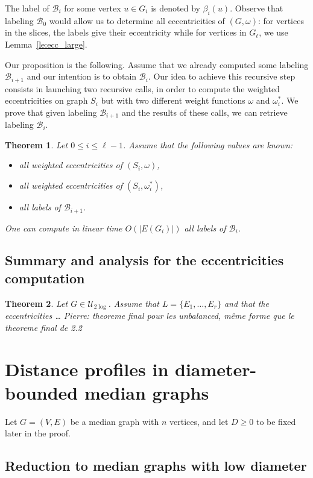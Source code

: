 \documentclass[11pt,letterpaper]{article}
\newtheorem{theorem}{Theorem}
\newcommand{\ulog}{\mathcal{U}_{2\log}}
\newcommand{\PB}[1]{{\color{orange} Pierre: #1}}
\begin{document}
The label of $\mathcal{B}_i$ for some vertex $u \in G_i$ is denoted by $\beta_i(u)$. Observe that labeling $\mathcal{B}_0$ would allow us to determine all eccentricities of $(G,\omega)$: for vertices in the slices, the labels give their eccentricity while for vertices in $G_{\ell}$, we use Lemma~\ref{le:ecc_large}. 

Our proposition is the following. Assume that we already computed some labeling $\mathcal{B}_{i+1}$ and our intention is to obtain $\mathcal{B}_i$. Our idea to achieve this recursive step consists in launching two recursive calls, in order to compute the weighted eccentricities on graph $S_i$ but with two different weight functions $\omega$ and $\omega_i^*$. We prove that given labeling $\mathcal{B}_{i+1}$ and the results of these calls, we can retrieve labeling $\mathcal{B}_{i}$.

\begin{theorem}
Let $0\le i\le \ell-1$. Assume that the following values are known:
\begin{itemize}
\item all weighted eccentricities of $(S_i,\omega)$,
\item all weighted eccentricities of $(S_i,\omega_i^*)$,
\item all labels of $\mathcal{B}_{i+1}$.
\end{itemize}
One can compute in linear time $O(\vert E(G_i)\vert)$ all labels of $\mathcal{B}_{i}$.
\end{theorem}

\subsection{Summary and analysis for the eccentricities computation}

\begin{theorem}
Let $G \in \ulog$. Assume that $L = \{E_1,\ldots,E_r\}$ and that the eccentricities \ldots \PB{theoreme final pour les unbalanced, même forme que le theoreme final de 2.2}
\end{theorem}

\section{Distance profiles in diameter-bounded median graphs}

Let $G=(V,E)$ be a median graph with $n$ vertices, and let $D \ge 0$ to be fixed later in the proof.

\subsection{Reduction to median graphs with low diameter}
\end{document}
